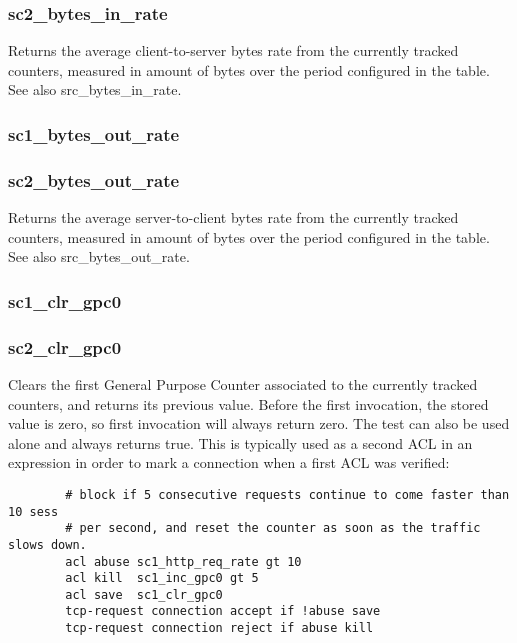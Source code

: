 \subsubsection[sc2\_bytes\_in\_rate]{sc2\_bytes\_in\_rate}
  Returns the average client-to-server bytes rate from the currently tracked
  counters, measured in amount of bytes over the period configured in the
  table. See also src\_bytes\_in\_rate.

\subsubsection[sc1\_bytes\_out\_rate]{sc1\_bytes\_out\_rate}
\subsubsection[sc2\_bytes\_out\_rate]{sc2\_bytes\_out\_rate}
  Returns the average server-to-client bytes rate from the currently tracked
  counters, measured in amount of bytes over the period configured in the
  table. See also src\_bytes\_out\_rate.

\subsubsection[sc1\_clr\_gpc0]{sc1\_clr\_gpc0}
\subsubsection[sc2\_clr\_gpc0]{sc2\_clr\_gpc0}
  Clears the first General Purpose Counter associated to the currently tracked
  counters, and returns its previous value. Before the first invocation, the
  stored value is zero, so first invocation will always return zero. The test
  can also be used alone and always returns true. This is typically used as a
  second ACL in an expression in order to mark a connection when a first ACL
  was verified:
  
  \begin{verbatim}
        # block if 5 consecutive requests continue to come faster than 10 sess
        # per second, and reset the counter as soon as the traffic slows down.
        acl abuse sc1_http_req_rate gt 10
        acl kill  sc1_inc_gpc0 gt 5
        acl save  sc1_clr_gpc0
        tcp-request connection accept if !abuse save
        tcp-request connection reject if abuse kill
  \end{verbatim}


